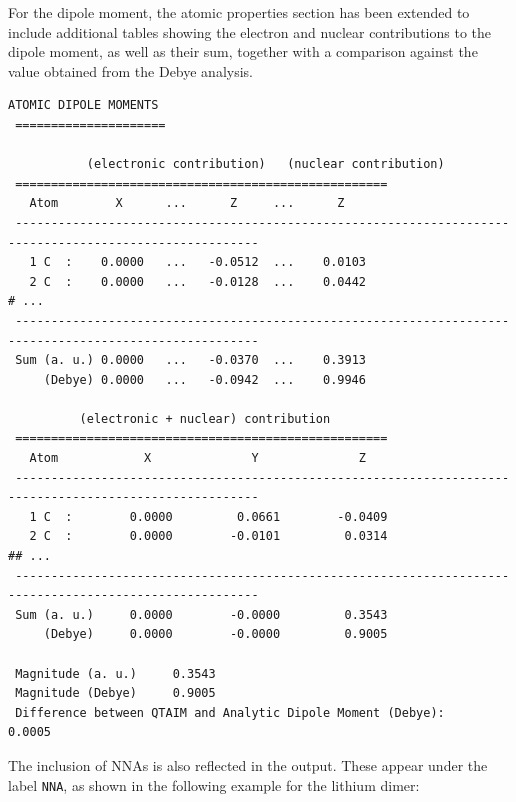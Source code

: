 \newpage
For the dipole moment, the atomic properties section has been extended to
include additional tables showing the electron and nuclear contributions to
the dipole moment, as well as their sum, together with a comparison against
the value obtained from the Debye analysis.

\begin{lstlisting}[language=plain]
 ATOMIC DIPOLE MOMENTS
 =====================

           (electronic contribution)   (nuclear contribution)
 ====================================================
   Atom        X      ...      Z     ...      Z
 --------------------------------------------------------------------------------------------------------
   1 C  :    0.0000   ...   -0.0512  ...    0.0103
   2 C  :    0.0000   ...   -0.0128  ...    0.0442
# ...
 --------------------------------------------------------------------------------------------------------
 Sum (a. u.) 0.0000   ...   -0.0370  ...    0.3913
     (Debye) 0.0000   ...   -0.0942  ...    0.9946

          (electronic + nuclear) contribution
 ====================================================
   Atom            X              Y              Z
 --------------------------------------------------------------------------------------------------------
   1 C  :        0.0000         0.0661        -0.0409
   2 C  :        0.0000        -0.0101         0.0314
## ...
 --------------------------------------------------------------------------------------------------------
 Sum (a. u.)     0.0000        -0.0000         0.3543
     (Debye)     0.0000        -0.0000         0.9005

 Magnitude (a. u.)     0.3543
 Magnitude (Debye)     0.9005
 Difference between QTAIM and Analytic Dipole Moment (Debye):       0.0005
\end{lstlisting}

\newpage
The inclusion of \glspl{NNA} is also reflected in the output. These appear
under the label \texttt{NNA}, as shown in the following example for the
lithium dimer:

